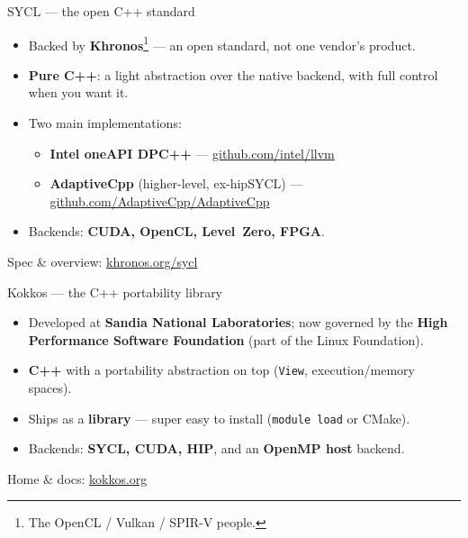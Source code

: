 \begin{frame}{SYCL --- the open C++ standard}
\begin{itemize}
  \item Backed by \textbf{Khronos}\footnote{The OpenCL / Vulkan / SPIR-V people.}
        --- an open standard, not one vendor's product.
  \item \textbf{Pure C++}: a light abstraction over the native backend, with full
        control when you want it.
  \item Two main implementations:
    \begin{itemize}
      \item \textbf{Intel oneAPI DPC++} --- \href{https://github.com/intel/llvm}{github.com/intel/llvm}
      \item \textbf{AdaptiveCpp} (higher-level, ex-hipSYCL) ---
            \href{https://github.com/AdaptiveCpp/AdaptiveCpp}{github.com/AdaptiveCpp/AdaptiveCpp}
    \end{itemize}
  \item Backends: \textbf{CUDA, OpenCL, Level~Zero, FPGA}.
\end{itemize}
\vfill
{\footnotesize Spec \& overview: \href{https://www.khronos.org/sycl/}{khronos.org/sycl}}
\end{frame}

\begin{frame}{Kokkos --- the C++ portability library}
\begin{itemize}
  \item Developed at \textbf{Sandia National Laboratories}; now governed by the
        \textbf{High Performance Software Foundation} (part of the Linux Foundation).
  \item \textbf{C++} with a portability abstraction on top (\texttt{View},
        execution/memory spaces).
  \item Ships as a \textbf{library} --- super easy to install (\texttt{module load}
        or CMake).
  \item Backends: \textbf{SYCL, CUDA, HIP}, and an \textbf{OpenMP host} backend.
\end{itemize}
\vfill
{\footnotesize Home \& docs: \href{https://kokkos.org}{kokkos.org}}
\end{frame}

